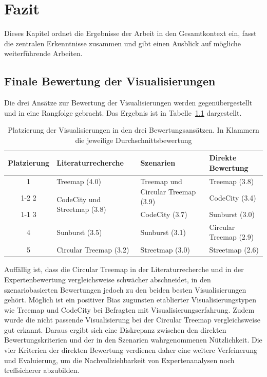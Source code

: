 \chapter{Fazit} \label{sec:Fazit}

Dieses Kapitel ordnet die Ergebnisse der Arbeit in den Gesamtkontext ein, fasst die zentralen Erkenntnisse zusammen und gibt einen Ausblick auf mögliche weiterführende Arbeiten.

\section{Finale Bewertung der Visualisierungen} \label{sec:FinaleBewertung}

Die drei Ansätze zur Bewertung der Visualisierungen werden gegenübergestellt und in eine Rangfolge gebracht. Das Ergebnis ist in Tabelle~\ref{tab:platzierungVergleich} dargestellt.

\begin{table}[htbp]
    \hspace*{-0.9cm}
    \scriptsize
    \begin{tabular}{|c|l|l|l|}
        \hline
        \textbf{Platzierung} & \textbf{Literaturrecherche} & \textbf{Szenarien} & \textbf{Direkte Bewertung} \\ \hline
        1 & Treemap (4.0) & \multirow{2}{*}{Treemap und Circular Treemap (3.9)} & Treemap (3.8) \\ \cline{1-2} \cline{4-4}
        2 & \multirow{2}{*}{CodeCity und Streetmap (3.8)} &  & CodeCity (3.4) \\ \cline{1-1} \cline{3-4}
        3 &  & CodeCity (3.7) & Sunburst (3.0) \\ \hline
        4 & Sunburst (3.5) & Sunburst (3.1) & Circular Treemap (2.9) \\ \hline
        5 & Circular Treemap (3.2) & Streetmap (3.0) & Streetmap (2.6) \\ \hline
    \end{tabular}
    \caption[Platzierungen der Visualisierungen]{Platzierung der Visualisierungen in den drei Bewertungsansätzen. In Klammern die jeweilige Durchschnittsbewertung}
    \label{tab:platzierungVergleich}
\end{table}

Auffällig ist, dass die Circular Treemap in der Literaturrecherche und in der Expertenbewertung vergleichsweise schwächer abschneidet, in den szenariobasierten Bewertungen jedoch zu den beiden besten Visualisierungen gehört. Möglich ist ein positiver Bias zugunsten etablierter Visualisierungstypen wie Treemap und CodeCity bei Befragten mit Visualisierungserfahrung. Zudem wurde die nicht passende Visualisierung bei der Circular Treemap vergleichsweise gut erkannt. Daraus ergibt sich eine Diskrepanz zwischen den direkten Bewertungskriterien und der in den Szenarien wahrgenommenen Nützlichkeit. Die vier Kriterien der direkten Bewertung verdienen daher eine weitere Verfeinerung und Evaluierung, um die Nachvollziehbarkeit von Expertenanalysen noch treffsicherer abzubilden.

